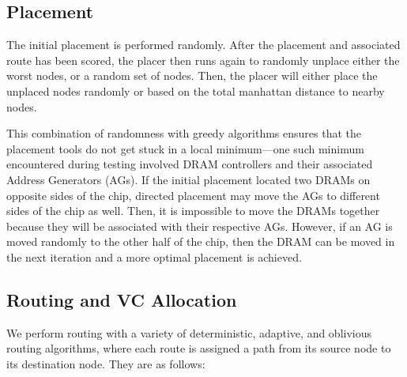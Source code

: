 \subsection{Placement}
The initial placement is performed randomly.
After the placement and associated route has been scored, the placer then runs again to randomly unplace either the worst nodes, or a random set of nodes.
Then, the placer will either place the unplaced nodes randomly or based on the total manhattan distance to nearby nodes.

This combination of randomness with greedy algorithms ensures that the placement tools do not get stuck in a local minimum---one such minimum encountered during testing involved DRAM controllers and their associated Address Generators (AGs).
If the initial placement located two DRAMs on opposite sides of the chip, directed placement may move the AGs to different sides of the chip as well.
Then, it is impossible to move the DRAMs together because they will be associated with their respective AGs. 
However, if an AG is moved randomly to the other half of the chip, then the DRAM can be moved in the next iteration and a more optimal placement is achieved.

\subsection{Routing and VC Allocation} \label{ssec:routing}
We perform routing with a variety of deterministic, adaptive, and oblivious routing algorithms, where each route is assigned a path from its source node to its destination node. They are as follows:

